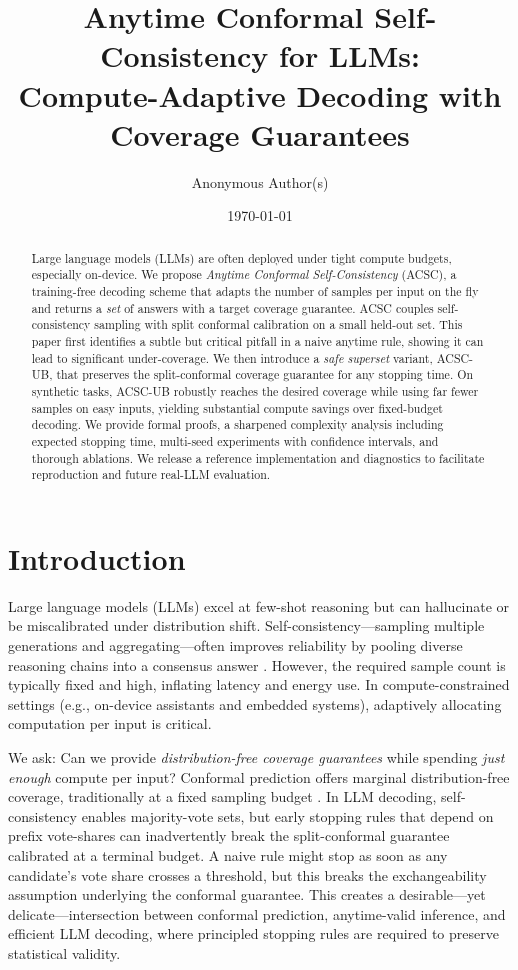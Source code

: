 \documentclass[11pt]{article}
\title{Anytime Conformal Self-Consistency for LLMs: \\
Compute-Adaptive Decoding with Coverage Guarantees}
\author{Anonymous Author(s)}
\date{\today}
\begin{document}
\maketitle

\begin{abstract}
Large language models (LLMs) are often deployed under tight compute budgets, especially on-device.
We propose \emph{Anytime Conformal Self-Consistency} (ACSC), a training-free decoding scheme that
adapts the number of samples per input on the fly and returns a \emph{set} of answers with a target coverage guarantee.
ACSC couples self-consistency sampling with split conformal calibration on a small held-out set.
This paper first identifies a subtle but critical pitfall in a naive anytime rule, showing it can lead to significant under-coverage. We then introduce a \emph{safe superset} variant, ACSC-UB, that preserves the split-conformal coverage guarantee for any stopping time. On synthetic tasks, ACSC-UB robustly reaches the desired coverage while using far fewer samples on easy inputs, yielding substantial compute savings over fixed-budget decoding. We provide formal proofs, a sharpened complexity analysis including expected stopping time, multi-seed experiments with confidence intervals, and thorough ablations. We release a reference implementation and diagnostics to facilitate reproduction and future real-LLM evaluation.
\end{abstract}

\section{Introduction}
Large language models (LLMs) excel at few-shot reasoning but can hallucinate or be miscalibrated under distribution shift.
Self-consistency---sampling multiple generations and aggregating---often improves reliability by
pooling diverse reasoning chains into a consensus answer \cite{wang2023selfconsistency}. However, the required sample count is
typically fixed and high, inflating latency and energy use. In compute-constrained settings
(e.g., on-device assistants and embedded systems), adaptively allocating computation per input is critical.

We ask: Can we provide \emph{distribution-free coverage guarantees} while spending \emph{just enough} compute per input?
Conformal prediction offers marginal distribution-free coverage, traditionally at a fixed sampling budget \cite{vovk2005algorithmic}.
In LLM decoding, self-consistency enables majority-vote sets, but early stopping rules that depend on prefix vote-shares can inadvertently break the split-conformal guarantee calibrated at a terminal budget. A naive rule might stop as soon as any candidate's vote share crosses a threshold, but this breaks the exchangeability assumption underlying the conformal guarantee. This creates a desirable---yet delicate---intersection between conformal prediction, anytime-valid inference, and efficient LLM decoding, where principled stopping rules are required to preserve statistical validity.
\end{document}
